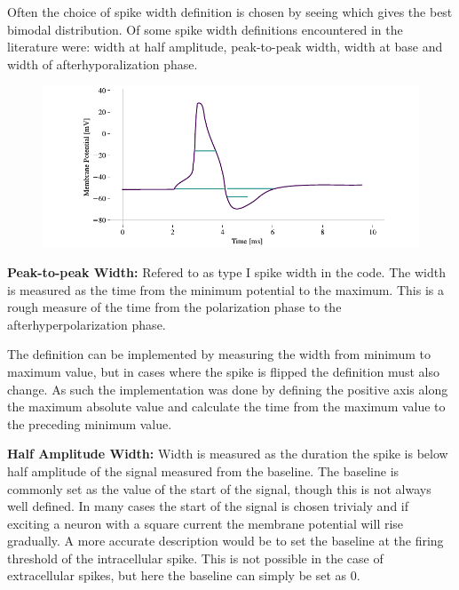 \documentclass[altfont, fleqn]{uiophd}
\begin{document}
Often the choice of spike width definition is chosen by
seeing which gives the best bimodal distribution. 
Of some spike width definitions encountered in the literature 
were:
width at half amplitude, 
peak-to-peak width, 
width at base
and 
width of afterhyporalization phase. 
\\
\begin{figure}[h]
    \centering
    \includegraphics[width=\textwidth]{images/sec_3/action_potential_widths.pdf}
    \caption{}
    \label{fig:2_1_neuron}
\end{figure}

\noindent 
{\bf Peak-to-peak Width:} 
Refered to as type I spike width in the code. 
The width is measured as the time from the minimum potential to the maximum. 
This is a rough measure of the time from the polarization phase to 
the afterhyperpolarization phase. 

The definition can be implemented by measuring the width from
minimum to maximum value, but in cases where the spike is flipped
the definition must also change. 
As such the implementation was done by defining the positive axis along 
the maximum absolute value and calculate the time from 
the maximum value to the preceding minimum value.
\newline


\noindent 
{\bf Half Amplitude Width:} 
Width is measured as the duration the spike is below half amplitude of the 
signal measured from the baseline.
The baseline is commonly set as the value of the start of the signal, 
though this is not always well defined. 
In many cases the start of the signal is chosen trivialy
and if exciting a neuron with a square current the membrane potential will 
rise gradually. 
A more accurate description would be to set the baseline at the firing 
threshold of 
the intracellular spike. 
This is not possible in the case of extracellular spikes,
but here the baseline can simply be set as 0. 
\newline
\end{document}

